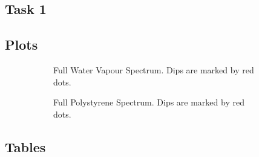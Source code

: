 \documentclass{article}
\begin{document}
\begin{appendices}

\section{Task 1}
\label{app:task1}

\subsection{Plots}
\label{app:task1_plots}

\begin{figure}[h]
    \centering
    \begin{subfigure}[t]{0.48\textwidth}
        \centering
        \scalebox{0.5}{}
        \caption{Full Water Vapour Spectrum. Dips are marked by red dots.}
        \label{fig:water_vapour_full}
    \end{subfigure} \hfill
    \begin{subfigure}[t]{0.48\textwidth}
        \centering
        \scalebox{0.5}{}
        \caption{Full Polystyrene Spectrum. Dips are marked by red dots.}
        \label{fig:polystyrene_full}
    \end{subfigure}
	\caption{}
	\label{fig:water_polystyrene_full}
\end{figure}

\subsection{Tables}
\label{app:task1_tables}


\end{appendices}
\end{document}

